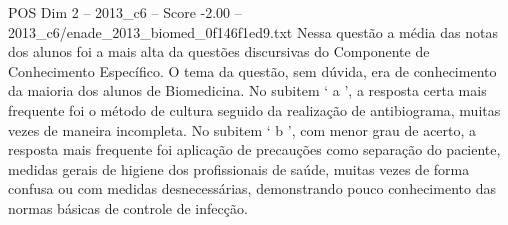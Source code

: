\begin{textsample}{POS Dim 2 – 2013\_c6 – Score -2.00 – 2013\_c6/enade\_2013\_biomed\_0f146f1ed9.txt}
Nessa questão a média das notas dos alunos foi a mais alta da questões discursivas do Componente de Conhecimento Específico.
O tema da questão, sem dúvida, era de conhecimento da maioria dos alunos de Biomedicina.
No subitem ‘ a ’, a resposta certa mais frequente foi o método de cultura seguido da realização de antibiograma, muitas vezes de maneira incompleta.
No subitem ‘ b ’, com menor grau de acerto, a resposta mais frequente foi aplicação de precauções como separação do paciente, medidas gerais de higiene dos profissionais de saúde, muitas vezes de forma confusa ou com medidas desnecessárias, demonstrando pouco conhecimento das normas básicas de controle de infecção.

\end{textsample}
